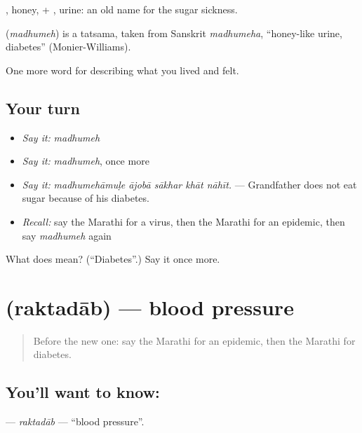 , honey, + , urine: an old name for the sugar sickness.

\begin{cousinweb}
\textbf{} (\emph{madhumeh}) is a tatsama, taken from Sanskrit \emph{madhumeha}, \textquotedblleft{}honey-like urine, diabetes\textquotedblright{} (Monier-Williams).
\end{cousinweb}

\begin{grammarlens}[title={What you've built}]
One more word for describing what you lived and felt.
\end{grammarlens}

\subsection*{Your turn}
\begin{itemize}
\raggedright
  \item \emph{Say it:} \emph{madhumeh}
  \item \emph{Say it:} \emph{madhumeh}, once more
  \item \emph{Say it:} \emph{madhumehāmuḷe ājobā sākhar khāt nāhīt.} — Grandfather does not eat sugar because of his diabetes.
  \item \emph{Recall:} say the Marathi for a virus, then the Marathi for an epidemic, then say \emph{madhumeh} again
\end{itemize}

\begin{tcolorbox}[breakable,colback=teal!4,colframe=teal!35!black,title={Before you move on}]
What does  mean? (\textquotedblleft{}Diabetes\textquotedblright{}.) Say it once more.
\end{tcolorbox}
\section[\texorpdfstring{\mr{रक्तदाब} (raktadāb)}{रक्तदाब (raktadāb)}]{ (raktadāb) — blood pressure}

\label{lesson:MR-C485-raktadab}



\begin{quote}
Before the new one: say the Marathi for an epidemic, then the Marathi for diabetes.
\end{quote}

\subsection*{You'll want to know: }
\textbf{} — \emph{raktadāb} — \textquotedblleft{}blood pressure\textquotedblright{}.

